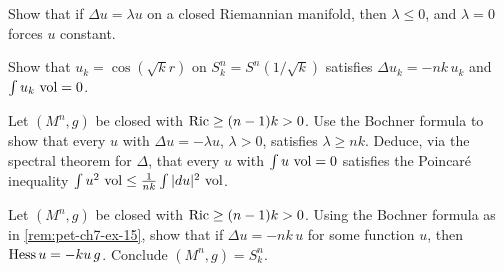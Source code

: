\begin{remark}
  \label{rem:pet-ch7-ex-13}

  Show that if $\Delta u=\lambda u$ on a closed Riemannian manifold, then
  $\lambda\le0$, and $\lambda=0$ forces $u$ constant.
\end{remark}

\begin{remark}
  \label{rem:pet-ch7-ex-14}

  Show that $u_k=\cos(\sqrt kr)$ on $S^n_k=S^n(1/\sqrt k)$ satisfies $\Delta
  u_k=-nk\,u_k$ and $\int u_k\,\operatorname{vol}=0$.
\end{remark}

\begin{remark}
  \label{rem:pet-ch7-ex-15}

  Let $(M^n,g)$ be closed with $\operatorname{Ric}\ge(n-1)k>0$. Use the Bochner formula to
  show that every $u$ with $\Delta u=-\lambda u$, $\lambda>0$, satisfies
  $\lambda\ge nk$. Deduce, via the spectral theorem for $\Delta$, that every
  $u$ with $\int u\,\operatorname{vol}=0$ satisfies the Poincaré inequality
  $\int u^2\,\operatorname{vol}\le\tfrac1{nk}\int|du|^2\,\operatorname{vol}$.
\end{remark}

\begin{remark}
  \label{rem:pet-ch7-ex-16}

  Let $(M^n,g)$ be closed with $\operatorname{Ric}\ge(n-1)k>0$. Using the Bochner formula as
  in \cref{rem:pet-ch7-ex-15}, show that if $\Delta u=-nk\,u$ for some
  function $u$, then $\operatorname{Hess} u=-ku\,g$. Conclude $(M^n,g)=S^n_k$.
\end{remark}

